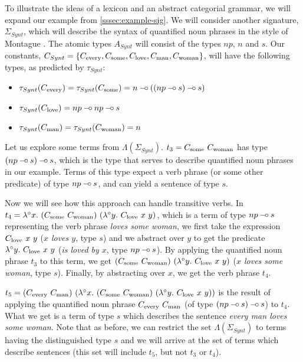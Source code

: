 To illustrate the ideas of a lexicon and an abstract categorial grammar,
we will expand our example from \ref{sssec:example-sig}. We will
consider another signature, $\Sigma_{Synt}$, which will describe the
syntax of quantified noun phrases in the style of Montague
\cite{montague1973proper}. The atomic types $A_{Synt}$ will consist of
the types $np$, $n$ and $s$. Our constants, $C_{Synt} = \{C_{\textrm{every}},
C_{\textrm{some}}, C_{\textrm{love}}, C_{\textrm{man}}, C_{\textrm{woman}}\}$, will have the
following types, as predicted by $\tau_{Synt}$:
\begin{itemize}
\item $\tau_{Synt}(C_{\textrm{every}}) = \tau_{Synt}(C_{\textrm{some}}) = n \mathbin{{-}\mkern-3.5mu{\circ}}
  ((np \mathbin{{-}\mkern-3.5mu{\circ}} s) \mathbin{{-}\mkern-3.5mu{\circ}} s)$
\item $\tau_{Synt}(C_{\textrm{love}}) = np \mathbin{{-}\mkern-3.5mu{\circ}} np \mathbin{{-}\mkern-3.5mu{\circ}} s$
\item $\tau_{Synt}(C_{\textrm{man}}) = \tau_{Synt}(C_{\textrm{woman}}) = n$
\end{itemize}

Let us explore some terms from $\Lambda(\Sigma_{Synt})$. $t_3 =
C_{\textrm{some}}\ C_{\textrm{woman}}$ has type $(np \mathbin{{-}\mkern-3.5mu{\circ}} s) \mathbin{{-}\mkern-3.5mu{\circ}} s$, which is the
type that serves to describe quantified noun phrases in our
example. Terms of this type expect a verb phrase (or some other
predicate) of type $np \mathbin{{-}\mkern-3.5mu{\circ}} s$, and can yield a sentence of type $s$.

Now we will see how this approach can handle transitive verbs. In $t_4 =
\lambda^{\circ} x.\ (C_{\textrm{some}}\ C_{\textrm{woman}})\ (\lambda^{\circ}
y.\ C_{\textrm{love}}\ x\ y)$, which is a term of type $np \mathbin{{-}\mkern-3.5mu{\circ}} s$
representing the verb phrase \emph{loves some woman}, we first take the
expression $C_{\textrm{love}}\ x\ y$ (\emph{$x$ loves $y$}, type $s$) and we
abstract over $y$ to get the predicate $\lambda^{\circ}
y.\ C_{\textrm{love}}\ x\ y$ (\emph{is loved by $x$}, type $np \mathbin{{-}\mkern-3.5mu{\circ}} s$). By
applying the quantified noun phrase $t_3$ to this term, we get
$(\synt{some}\ \synt{woman})\ (\lambda^{\circ} y.\ \synt{love}\ x\ y)$
(\emph{$x$ loves some woman}, type $s$). Finally, by abstracting over
$x$, we get the verb phrase $t_4$.

$t_5 = (\synt{every}\ \synt{man})\ (\lambda^{\circ}
x.\ (\synt{some}\ \synt{woman})\ (\lambda^{\circ}
y.\ \synt{love}\ x\ y))$ is the result of applying the quantified noun
phrase $C_{\textrm{every}}\ C_{\textrm{man}}$ (of type $(np \mathbin{{-}\mkern-3.5mu{\circ}} s) \mathbin{{-}\mkern-3.5mu{\circ}} s$) to
$t_4$. What we get is a term of type $s$ which describes the sentence
\emph{every man loves some woman}. Note that as before, we can restrict
the set $\Lambda(\Sigma_{Synt})$ to terms having the distinguished type
$s$ and we will arrive at the set of terms which describe sentences
(this set will include $t_5$, but not $t_3$ or $t_4$).

